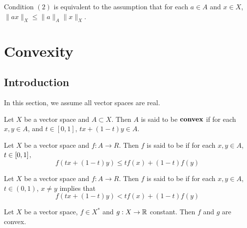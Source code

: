 \documentclass{book}
\begin{document}
	\begin{note}
		Condition $(2)$ is equivalent to the assumption that for each $a \in A$ and $x \in X$, $\|ax\|_X \leq \|a\|_A\|x\|_X$. 
	\end{note}
	
	
	
	
	
	
	
	
	
	
	
	
	
	
	
	
	
	

	
	
	
	
	
	
	\newpage
	\chapter{Convexity}
	
	\section{Introduction}

	\begin{note}
	In this section, we assume all vector spaces are real.
	\end{note}

	\begin{defn} 
	Let $X$ be a vector space and $A \subset X$. Then $A$ is said to be $\textbf{convex}$ if for each $x, y \in A$, and $t \in [0,1]$,  $tx + (1-t)y \in A$. 
	\end{defn}	
	
	\begin{defn} 
	Let $X$ be a vector space and $f:A \rightarrow R$. Then $f$ is said to be  if for each $x,y \in A$, $t \in [0,1]$, $$f(tx + (1-t)y) \leq tf(x) + (1-t)f(y)$$
	\end{defn}
	
	\begin{defn} 
	Let $X$ be a vector space and $f:A \rightarrow R$. Then $f$ is said to be  if for each $x,y \in A$, $t \in (0,1)$, $x \neq y$ implies that $$f(tx + (1-t)y) < tf(x) + (1-t)f(y)$$
	\end{defn}
	
	\begin{ex} 
	Let $X$ be a vector space, $f \in X^*$ and $g: X \rightarrow \mathbb{R}$ constant. Then $f$ and $g$ are convex. 
	\end{ex}
	
\end{document}
